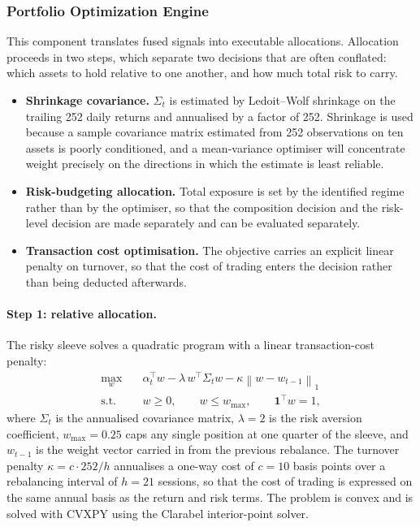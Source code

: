 \documentclass{singlecol-new}
\theoremstyle{TH}{
\newtheorem{lemma}{Lemma}
\newtheorem{theorem}[lemma]{Theorem}
\newtheorem{corrolary}[lemma]{Corrolary}
\newtheorem{conjecture}[lemma]{Conjecture}
\newtheorem{proposition}[lemma]{Proposition}
\newtheorem{claim}[lemma]{Claim}
\newtheorem{stheorem}[lemma]{Wrong Theorem}
\newtheorem{algorithm}{Algorithm}
}
\theoremstyle{THrm}{
\newtheorem{definition}{Definition}[section]
\newtheorem{question}{Question}[section]
\newtheorem{remark}{Remark}
\newtheorem{scheme}{Scheme}
}
\theoremstyle{THhit}{
\newtheorem{case}{Case}[section]
}
\begin{document}
\subsubsection{Portfolio Optimization Engine}

This component translates fused signals into executable allocations. Allocation proceeds
in two steps, which separate two decisions that are often conflated: which assets to hold
relative to one another, and how much total risk to carry.

\begin{itemize}
\item \textbf{Shrinkage covariance.} $\Sigma_t$ is estimated by Ledoit--Wolf shrinkage
\citep{ledoit04} on the trailing 252 daily returns and annualised by a factor of 252.
Shrinkage is used because a sample covariance matrix estimated from 252 observations on
ten assets is poorly conditioned, and a mean-variance optimiser will concentrate weight
precisely on the directions in which the estimate is least reliable.
\item \textbf{Risk-budgeting allocation.} Total exposure is set by the identified regime
rather than by the optimiser, so that the composition decision and the risk-level
decision are made separately and can be evaluated separately.
\item \textbf{Transaction cost optimisation.} The objective carries an explicit linear
penalty on turnover, so that the cost of trading enters the decision rather than being
deducted afterwards.
\end{itemize}

\paragraph{Step 1: relative allocation.} The risky sleeve solves a quadratic program with
a linear transaction-cost penalty:
\begin{align}
\max_{w} \quad & \alpha_t^{\top} w - \lambda \, w^{\top} \Sigma_t w
- \kappa \left\| w - w_{t-1} \right\|_1 \\
\text{s.t.} \quad & w \geq 0, \qquad w \leq w_{\max}, \qquad \mathbf{1}^{\top} w = 1,
\end{align}
where $\Sigma_t$ is the annualised covariance matrix, $\lambda = 2$ is the risk aversion
coefficient, $w_{\max} = 0.25$ caps any single position at one quarter of the sleeve, and
$w_{t-1}$ is the weight vector carried in from the previous rebalance. The turnover
penalty $\kappa = c \cdot 252 / h$ annualises a one-way cost of $c = 10$ basis points
over a rebalancing interval of $h = 21$ sessions, so that the cost of trading is expressed
on the same annual basis as the return and risk terms. The problem is convex and is
solved with CVXPY using the Clarabel interior-point solver.
\end{document}
